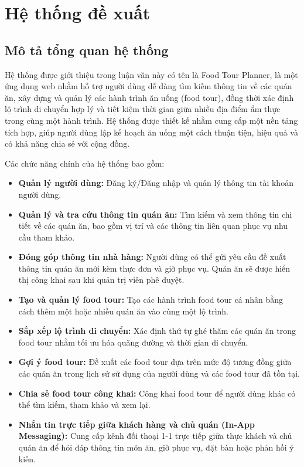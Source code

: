 \section{Hệ thống đề xuất}
\subsection{Mô tả tổng quan hệ thống}
Hệ thống được giới thiệu trong luận văn này có tên là Food Tour Planner, là
một ứng dụng web nhằm hỗ trợ người dùng dễ dàng tìm kiếm thông tin về các quán ăn, xây dựng và quản
lý các hành trình ăn uống (food tour), đồng thời xác định lộ trình di chuyển hợp lý và tiết kiệm thời gian giữa nhiều
địa điểm ẩm thực trong cùng một hành trình. Hệ thống được thiết kế nhằm cung cấp một nền
tảng tích hợp, giúp người dùng lập kế hoạch ăn uống một cách thuận tiện, hiệu quả và có khả
năng chia sẻ với cộng đồng.

Các chức năng chính của hệ thống bao gồm:

\begin{itemize}[label=\textbullet]
    \item \textbf{Quản lý người dùng:} Đăng ký/Đăng nhập và quản lý thông tin tài khoản người dùng.
    \item \textbf{Quản lý và tra cứu thông tin quán ăn:} Tìm kiếm và xem thông tin chi tiết
    về các quán ăn, bao gồm vị trí và các thông tin liên quan phục vụ nhu cầu tham khảo.
    \item \textbf{Đóng góp thông tin nhà hàng:} Người dùng có thể gửi yêu cầu đề xuất thông tin quán ăn mới kèm thực đơn và giờ phục vụ. Quán ăn sẽ được hiển thị công khai sau khi quản trị viên phê duyệt.
    \item \textbf{Tạo và quản lý food tour:} Tạo các hành trình food tour cá nhân
    bằng cách thêm một hoặc nhiều quán ăn vào cùng một lộ trình.
    \item \textbf{Sắp xếp lộ trình di chuyển:} Xác định thứ tự ghé thăm các quán ăn trong food tour
    nhằm tối ưu hóa quãng đường và thời gian di chuyển.
    \item \textbf{Gợi ý food tour:} Đề xuất các food tour dựa trên mức độ tương đồng giữa các quán ăn trong
    lịch sử sử dụng của người dùng và các food tour đã tồn tại.
    \item \textbf{Chia sẻ food tour công khai:} Công khai food tour để người dùng khác
    có thể tìm kiếm, tham khảo và xem lại.
    \item \textbf{Nhắn tin trực tiếp giữa khách hàng và chủ quán (In-App Messaging):} Cung cấp kênh đối thoại 1-1 trực tiếp giữa thực khách và chủ quán ăn để hỏi đáp thông tin món ăn, giờ phục vụ, đặt bàn hoặc phản hồi ý kiến.
\end{itemize}

